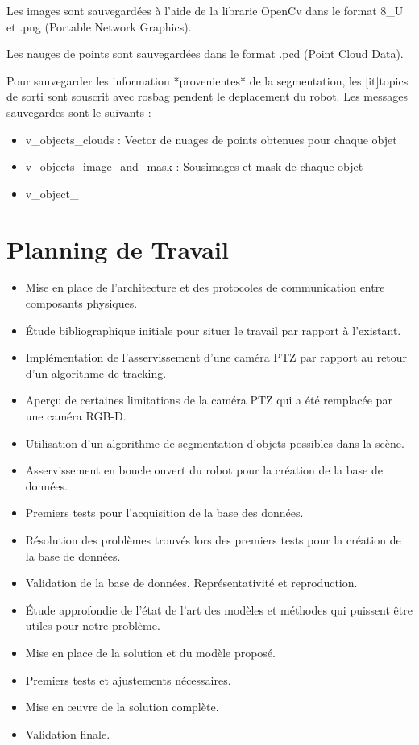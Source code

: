 Les images sont sauvegardées à l'aide de la librarie OpenCv dans le format 8\_U et .png (Portable Network Graphics).

Les nauges de points sont sauvegardées dans le format .pcd (Point Cloud Data).

Pour sauvegarder les information *provenientes* de la segmentation, les [it]topics de sorti sont souscrit avec rosbag pendent le deplacement du robot. Les messages sauvegardes sont le suivants :

\begin{itemize}
\item v\_objects\_clouds : Vector de nuages de points obtenues pour chaque objet 

\item v\_objects\_image\_and\_mask : Sousimages et mask de chaque objet

\item v\_object\_

\end{itemize}


\section{Planning de Travail}
\begin{itemize}
    \item[\checkmark] Mise en place de l'architecture et des protocoles de communication entre composants physiques.
    \item[\checkmark] Étude bibliographique initiale pour situer le travail par rapport à l'existant.
    \item[\checkmark] Implémentation de l'asservissement d'une caméra PTZ par rapport au retour d'un algorithme de tracking.
    \item[\checkmark] Aperçu de certaines limitations de la caméra PTZ qui a été remplacée par une caméra RGB-D.
    \item[\checkmark] Utilisation d'un algorithme de segmentation d'objets possibles dans la scène.
    \item[\checkmark] Asservissement en boucle ouvert du robot pour la création de la base de données.
    \item[\checkmark] Premiers tests pour l'acquisition de la base des données.
    \item Résolution des problèmes trouvés lors des premiers tests pour la création de la base de données.
    \item Validation de la base de données. Représentativité et reproduction.
    \item Étude approfondie de l’état de l'art des modèles et méthodes qui puissent être utiles pour notre problème.
    \item Mise en place de la solution et du modèle proposé.
    \item Premiers tests et ajustements nécessaires.
    \item Mise en œuvre de la solution complète.
    \item Validation finale.    
\end{itemize}

